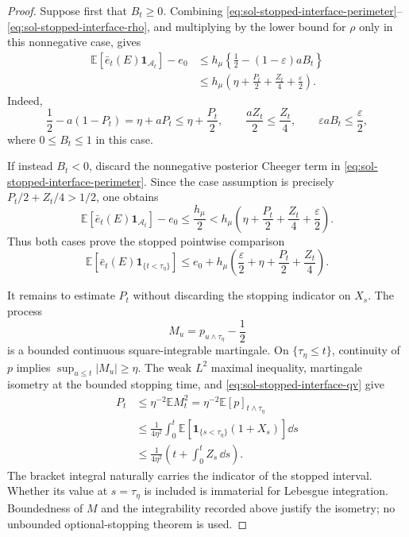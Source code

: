 \documentclass[../main.tex]{subfiles}
\begin{document}
\begin{proof}
Suppose first that $B_t\geq0$.  Combining
\eqref{eq:sol-stopped-interface-perimeter}--
\eqref{eq:sol-stopped-interface-rho}, and multiplying by the lower bound for $\rho$
only in this nonnegative case, gives
\[
\begin{split}
  \mathbb E[\bar e_t(E)\mathbf1_{\mathcal A_t}]-e_0
  &\leq h_\mu\left\{\frac12-(1-\varepsilon)aB_t\right\}\\
  &\leq h_\mu\left(
       \eta+\frac{P_t}{2}+\frac{Z_t}{4}+\frac\varepsilon2\right).
\end{split}
\]
Indeed,
\[
  \frac12-a(1-P_t)=\eta+aP_t\leq\eta+\frac{P_t}{2},
  \qquad \frac{aZ_t}{2}\leq\frac{Z_t}{4},
  \qquad \varepsilon aB_t\leq\frac\varepsilon2,
\]
where $0\leq B_t\leq1$ in this case.

If instead $B_t<0$, discard the nonnegative posterior Cheeger term in
\eqref{eq:sol-stopped-interface-perimeter}.  Since the case assumption is precisely
$P_t/2+Z_t/4>1/2$, one obtains
\[
  \mathbb E[\bar e_t(E)\mathbf1_{\mathcal A_t}]-e_0
  \leq\frac{h_\mu}{2}
  <h_\mu\left(
       \eta+\frac{P_t}{2}+\frac{Z_t}{4}+\frac\varepsilon2\right).
\]
Thus both cases prove the stopped pointwise comparison
\begin{equation}
  \mathbb E[\bar e_t(E)\mathbf1_{\{t<\tau_\eta\}}]
  \leq e_0+h_\mu\left(
       \frac\varepsilon2+\eta+\frac{P_t}{2}+\frac{Z_t}{4}\right).
  \label{eq:sol-stopped-interface-pointwise}
\end{equation}

It remains to estimate $P_t$ without discarding the stopping indicator on $X_s$.  The
process
\[
  M_u=p_{u\wedge\tau_\eta}-\frac12
\]
is a bounded continuous square-integrable martingale.  On
$\{\tau_\eta\leq t\}$, continuity of $p$ implies
$\sup_{u\leq t}|M_u|\geq\eta$.  The weak $L^2$ maximal inequality, martingale
isometry at the bounded stopping time, and \eqref{eq:sol-stopped-interface-qv} give
\begin{equation}
\begin{split}
  P_t
  &\leq\eta^{-2}\mathbb E M_t^2
   =\eta^{-2}\mathbb E[p]_{t\wedge\tau_\eta}\\
  &\leq\frac1{4\eta^2}\int_0^t
       \mathbb E\!\left[
         \mathbf1_{\{s<\tau_\eta\}}(1+X_s)\right]\dd s\\
  &\leq\frac1{4\eta^2}\left(t+\int_0^t Z_s\,\dd s\right).
\end{split}
\label{eq:sol-stopped-interface-exit}
\end{equation}
The bracket integral naturally carries the indicator of the stopped interval.  Whether its
value at $s=\tau_\eta$ is included is immaterial for Lebesgue integration.  Boundedness of
$M$ and the integrability recorded above justify the isometry; no unbounded optional-stopping
theorem is used.


\end{proof}
\end{document}
